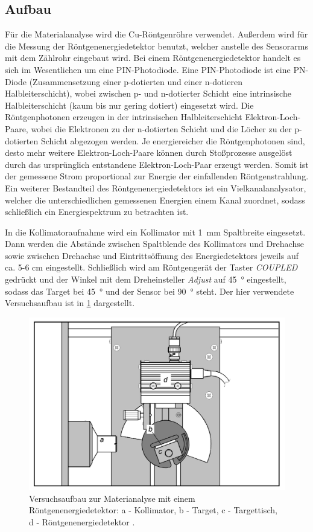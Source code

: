 \subsection{Aufbau}\label{subsec:material_aufbau}
Für die Materialanalyse wird die Cu-Röntgenröhre verwendet. Außerdem wird für die Messung der Röntgenenergiedetektor benutzt, welcher anstelle
des Sensorarms mit dem Zählrohr eingebaut wird. Bei einem Röntgenenergiedetektor handelt es sich im Wesentlichen um eine PIN-Photodiode.
Eine PIN-Photodiode ist eine PN-Diode (Zusammensetzung einer p-dotierten und einer n-dotieren Halbleiterschicht), wobei zwischen
p- und n-dotierter Schicht eine intrinsische Halbleiterschicht (kaum bis nur gering dotiert) eingesetzt wird. Die Röntgenphotonen
erzeugen in der intrinsischen Halbleiterschicht Elektron-Loch-Paare, wobei die Elektronen zu der n-dotierten Schicht und die Löcher
zu der p-dotierten Schicht abgezogen werden. Je energiereicher die Röntgenphotonen sind, desto mehr weitere Elektron-Loch-Paare können durch
Stoßprozesse ausgelöst durch das ursprünglich entstandene Elektron-Loch-Paar erzeugt werden. Somit ist der gemessene Strom
proportional zur Energie der einfallenden Röntgenstrahlung. Ein weiterer Bestandteil des Röntgenenergiedetektors ist ein
Vielkanalanalysator, welcher die unterschiedlichen gemessenen Energien einem Kanal zuordnet, sodass schließlich ein Energiespektrum zu
betrachten ist.\par
In die Kollimatoraufnahme wird ein Kollimator mit \SI{1}{\milli \meter} Spaltbreite eingesetzt.
Dann werden die Abstände zwischen Spaltblende des Kollimators und Drehachse sowie zwischen Drehachse und Eintrittsöffnung des Energiedetektors jeweils
auf ca. 5-6 \unit{\cm} eingestellt. Schließlich wird am Röntgengerät der Taster \textit{COUPLED} gedrückt und der Winkel mit dem Dreheinsteller
\textit{Adjust} auf \SI{45}{\degree} eingestellt, sodass das Target bei \SI{45}{\degree} und der Sensor bei \SI{90}{\degree} steht.
Der hier verwendete Versuchsaufbau ist in \cref{fig:aufbau_material} dargestellt.
\begin{figure}[H]
	\centering
	\includegraphics[width=0.6\linewidth]{../figs/aufbau_material.png}
	\caption{Versuchsaufbau zur Materianalyse mit einem Röntgenenergiedetektor:
    a - Kollimator, b - Target, c - Targettisch, d - Röntgenenergiedetektor \cite{material_handblatt}.}
	\label{fig:aufbau_material}
\end{figure}
